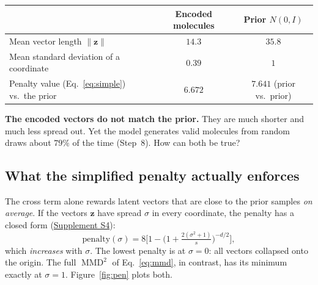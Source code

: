 \documentclass[11pt]{article}
\DeclareMathOperator{\MMD}{MMD}
\begin{document}
\begin{center}
\begin{tabular}{@{}lcc@{}}
\toprule
 & Encoded molecules & Prior $N(0,I)$\\
\midrule
Mean vector length $\lVert\bm z\rVert$ & $14.3$ & $35.8$\\
Mean standard deviation of a coordinate & $0.39$ & $1$\\
Penalty value (Eq.~\ref{eq:simple}) vs.\ the prior & $6.672$ & $7.641$ (prior vs.\ prior)\\
\bottomrule
\end{tabular}
\end{center}

\textbf{The encoded vectors do not match the prior.} They are much shorter and much less spread out. Yet the model generates valid molecules from random draws about $79\%$ of the time (Step~8). How can both be true?

\subsection*{What the simplified penalty actually enforces}
The cross term alone rewards latent vectors that are close to the prior samples \emph{on average}. If the vectors $\bm z$ have spread $\sigma$ in every coordinate, the penalty has a closed form (\hyperref[sec:S4]{Supplement S4}):
\begin{equation}
  \text{penalty}(\sigma)=8\Big[1-\Big(1+\tfrac{2(\sigma^2+1)}{s}\Big)^{-d/2}\Big],
\end{equation}
which \emph{increases} with $\sigma$. The lowest penalty is at $\sigma=0$: all vectors collapsed onto the origin. The full $\MMD^2$ of Eq.~\eqref{eq:mmd}, in contrast, has its minimum exactly at $\sigma=1$. Figure~\ref{fig:pen} plots both.
\end{document}
